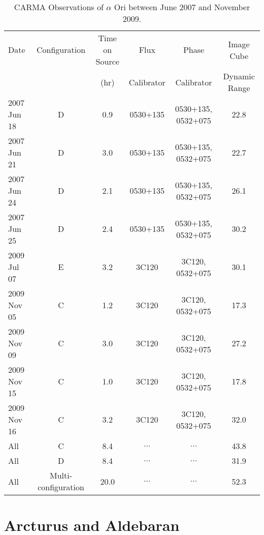 \begin{landscape}
\begin{table}
\begin{center}
\caption[CARMA Observations of $\alpha$ Ori.]
{CARMA Observations of $\alpha$ Ori between June 2007 and November 2009.}
\begin{tabular}{lccccc}
\hline
\hline
\rule{0pt}{2.5ex}Date & Configuration & Time on Source & Flux		& Phase 	& Image Cube \\
	 & 				 &  (hr)		  & Calibrator	& Calibrator& Dynamic Range \\
\hline
\rule{0pt}{2.5ex}2007 Jun 18 	& D & 0.9 & 0530+135	& 0530+135, 0532+075 	&  22.8 \\
2007 Jun 21 	& D & 3.0 & 0530+135	& 0530+135, 0532+075 	&  22.7 \\
2007 Jun 24 	& D & 2.1 & 0530+135	& 0530+135, 0532+075 	&  26.1 \\
2007 Jun 25 	& D & 2.4 & 0530+135	& 0530+135, 0532+075 	&  30.2 \\
2009 Jul 07	& E & 3.2 & 3C120 		& 3C120, 0532+075	& 30.1 \\
2009 Nov 05	& C & 1.2 & 3C120 		& 3C120, 0532+075 	& 17.3 \\
2009 Nov 09 	& C & 3.0 & 3C120 		& 3C120, 0532+075 	& 27.2 \\
2009 Nov 15	& C & 1.0 & 3C120 		& 3C120, 0532+075 	& 17.8 \\
2009 Nov 16	& C & 3.2 & 3C120 		& 3C120, 0532+075 	& 32.0  \\
All		& C & 8.4	&  $\dots$	& 	$\dots$	& 43.8 \\
All 		& D & 8.4 &  $\dots$	&  	$\dots$	& 31.9 \\
All 		& Multi-configuration & 20.0 & $\dots$& $\dots$ 	& 52.3 \\
\hline
\end{tabular}
\label{tab:3.3}
\end{center}
\end{table}
\end{landscape}

\section{Arcturus and Aldebaran}\label{sec:3.4}

